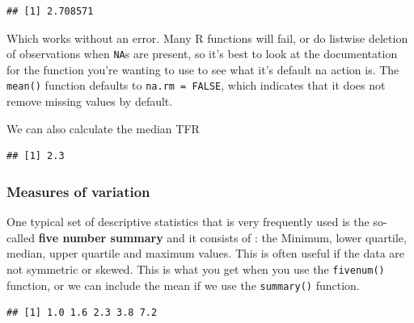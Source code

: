 \documentclass[
]{article}
\newenvironment{Shaded}{\begin{snugshade}}{\end{snugshade}}
\newcommand{\AttributeTok}[1]{\textcolor[rgb]{0.77,0.63,0.00}{#1}}
\newcommand{\ConstantTok}[1]{\textcolor[rgb]{0.00,0.00,0.00}{#1}}
\newcommand{\FunctionTok}[1]{\textcolor[rgb]{0.00,0.00,0.00}{#1}}
\newcommand{\NormalTok}[1]{#1}
\newcommand{\SpecialCharTok}[1]{\textcolor[rgb]{0.00,0.00,0.00}{#1}}
\begin{document}
\begin{verbatim}
## [1] 2.708571
\end{verbatim}

Which works without an error. Many R functions will fail, or do listwise
deletion of observations when \texttt{NA}s are present, so it's best to look at
the documentation for the function you're wanting to use to see what
it's default na action is. The \texttt{mean()} function defaults to
\texttt{na.rm\ =\ FALSE}, which indicates that it does not remove missing values
by default.

We can also calculate the median TFR

\begin{Shaded}
\end{Shaded}

\begin{verbatim}
## [1] 2.3
\end{verbatim}

\hypertarget{measures-of-variation}{%
\subsubsection{Measures of variation}\label{measures-of-variation}}

One typical set of descriptive statistics that is very frequently used
is the so-called \textbf{five number summary} and it consists of : the
Minimum, lower quartile, median, upper quartile and maximum values. This
is often useful if the data are not symmetric or skewed. This is what
you get when you use the \texttt{fivenum()} function, or we can include the
mean if we use the \texttt{summary()} function.

\begin{Shaded}
\end{Shaded}

\begin{verbatim}
## [1] 1.0 1.6 2.3 3.8 7.2
\end{verbatim}

\begin{Shaded}
\end{Shaded}
\end{document}
